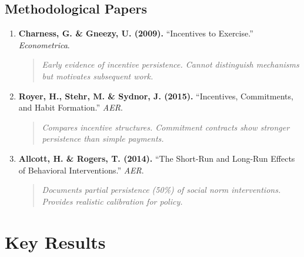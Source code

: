 \documentclass[11pt, a4paper]{article}
\begin{document}
\subsection{Methodological Papers}

\begin{enumerate}[resume]

\item \textbf{Charness, G. \& Gneezy, U. (2009).} ``Incentives to Exercise.'' \textit{Econometrica}.
\begin{quote}
\textit{Early evidence of incentive persistence. Cannot distinguish mechanisms but motivates subsequent work.}
\end{quote}

\item \textbf{Royer, H., Stehr, M. \& Sydnor, J. (2015).} ``Incentives, Commitments, and Habit Formation.'' \textit{AER}.
\begin{quote}
\textit{Compares incentive structures. Commitment contracts show stronger persistence than simple payments.}
\end{quote}

\item \textbf{Allcott, H. \& Rogers, T. (2014).} ``The Short-Run and Long-Run Effects of Behavioral Interventions.'' \textit{AER}.
\begin{quote}
\textit{Documents partial persistence (50\%) of social norm interventions. Provides realistic calibration for policy.}
\end{quote}

\end{enumerate}


\section{Key Results}
\label{sec:lrn-results}
\end{document}
